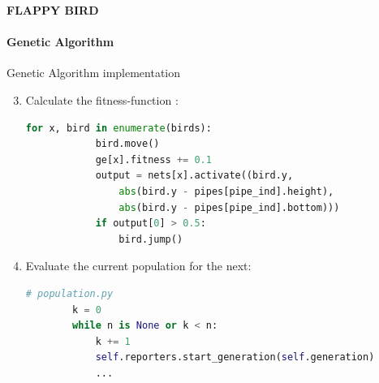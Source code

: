 \documentclass[10pt]{beamer}
\begin{document}
{
%
\begin{frame}[fragile]{\textbf{FLAPPY BIRD}}
        \framesubtitle{\textbf{Genetic Algorithm}}
        Genetic Algorithm implementation
        \begin{enumerate}
            \setcounter{enumi}{2}
            \item Calculate the fitness-function : 
                    \begin{lstlisting}[language=Python]
        for x, bird in enumerate(birds):
            bird.move()
            ge[x].fitness += 0.1
            output = nets[x].activate((bird.y,
                abs(bird.y - pipes[pipe_ind].height),
                abs(bird.y - pipes[pipe_ind].bottom)))
            if output[0] > 0.5:
                bird.jump()
                    \end{lstlisting}
                \pause 
            \item Evaluate the current population for the next: 
                    \begin{lstlisting}[language=Python]
        # population.py
        k = 0
        while n is None or k < n:
            k += 1
            self.reporters.start_generation(self.generation)
            ... 
                    \end{lstlisting}
        \end{enumerate}
\end{frame}
}
\end{document}
